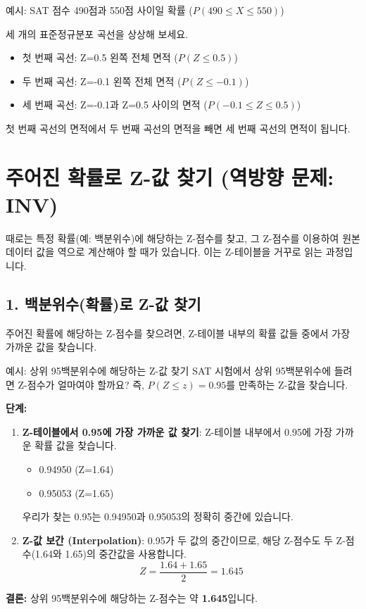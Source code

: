 \documentclass[11pt,a4paper]{article}
\begin{document}
\begin{examplebox}{예시: SAT 점수 490점과 550점 사이일 확률 ($P(490 \le X \le 550)$)}
\begin{tcolorbox}[title=\textbf{시각적 이해}, colback=blue!5!white, colframe=blue!75!black]
세 개의 표준정규분포 곡선을 상상해 보세요.
\begin{itemize}
    \item 첫 번째 곡선: Z=0.5 왼쪽 전체 면적 ($P(Z \le 0.5)$)
    \item 두 번째 곡선: Z=-0.1 왼쪽 전체 면적 ($P(Z \le -0.1)$)
    \item 세 번째 곡선: Z=-0.1과 Z=0.5 사이의 면적 ($P(-0.1 \le Z \le 0.5)$)
\end{itemize}
첫 번째 곡선의 면적에서 두 번째 곡선의 면적을 빼면 세 번째 곡선의 면적이 됩니다.
\end{tcolorbox}
\end{examplebox}

\newpage
\section*{주어진 확률로 Z-값 찾기 (역방향 문제: INV)}
때로는 특정 확률(예: 백분위수)에 해당하는 Z-점수를 찾고, 그 Z-점수를 이용하여 원본 데이터 값을 역으로 계산해야 할 때가 있습니다. 이는 Z-테이블을 거꾸로 읽는 과정입니다.

\subsection*{1. 백분위수(확률)로 Z-값 찾기}
주어진 확률에 해당하는 Z-점수를 찾으려면, Z-테이블 내부의 확률 값들 중에서 가장 가까운 값을 찾습니다.

\begin{examplebox}{예시: 상위 95백분위수에 해당하는 Z-값 찾기}
SAT 시험에서 상위 95백분위수에 들려면 Z-점수가 얼마여야 할까요? 즉, $P(Z \le z) = 0.95$를 만족하는 Z-값을 찾습니다.

\textbf{단계:}
\begin{enumerate}
    \item \textbf{Z-테이블에서 0.95에 가장 가까운 값 찾기}: Z-테이블 내부에서 0.95에 가장 가까운 확률 값을 찾습니다.
    \begin{itemize}
        \item 0.94950 (Z=1.64)
        \item 0.95053 (Z=1.65)
    \end{itemize}
    우리가 찾는 0.95는 0.94950과 0.95053의 정확히 중간에 있습니다.
    \item \textbf{Z-값 보간 (Interpolation)}: 0.95가 두 값의 중간이므로, 해당 Z-점수도 두 Z-점수(1.64와 1.65)의 중간값을 사용합니다.
    \[ Z = \frac{1.64 + 1.65}{2} = 1.645 \]
\end{enumerate}
\textbf{결론:} 상위 95백분위수에 해당하는 Z-점수는 약 \textbf{1.645}입니다.
\end{examplebox}
\end{document}
